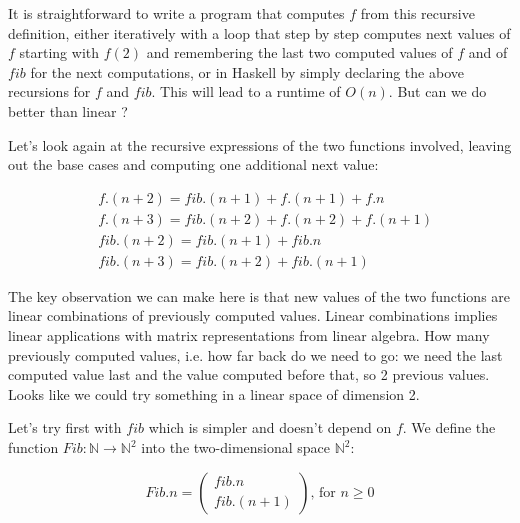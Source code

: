 It is straightforward to write a program that computes $f$ from this recursive definition, either iteratively with a loop that step by step computes next values of $f$ starting with $f(2)$ and remembering the last two computed values of $f$ and of $\mathit{fib}$ for the next computations, or in Haskell by simply declaring the above recursions for $f$ and $\mathit{fib}$. This will lead to a runtime of $O(n)$. But can we do better than linear ?

Let's look again at the recursive expressions of the two functions involved, leaving out the base cases and computing one additional next value:

\begin{equation*}
\begin{split}
& f.(n + 2) = \mathit{fib}.(n + 1) + f.(n + 1) + f.n \\
& f.(n + 3) = \mathit{fib}.(n + 2) + f.(n + 2) + f.(n + 1) \\
& \mathit{fib}.(n + 2) = \mathit{fib}.(n + 1) + \mathit{fib}.n \\
& \mathit{fib}.(n + 3) = \mathit{fib}.(n + 2) + \mathit{fib}.(n + 1)
\end{split}   
\end{equation*}

The key observation we can make here is that new values of the two functions are linear combinations of previously computed values. Linear combinations implies linear applications with matrix representations from linear algebra. How many previously computed values, i.e. how far back do we need to go: we need the last computed value last and the value computed before that, so 2 previous values. Looks like we could try something in a linear space of dimension 2. 

Let's try first with $\mathit{fib}$ which is simpler and doesn't depend on $f$. We define the function $\mathit{Fib}: \mathbb{N}  \rightarrow \mathbb{N}^2$ into the two-dimensional space $\mathbb{N}^2$:

\[
  \mathit{Fib}.n = 
  \begin{pmatrix}
       \mathit{fib}.n \\
       \mathit{fib}.(n + 1)
   \end{pmatrix}   \text{, for } n \geq 0 
\]


